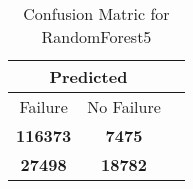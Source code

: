 \begin{table}[] 
\caption{Confusion Matric for RandomForest5} 
\label{Table: Prediction Accuracy-DMDRandomForest5OnlySunEKF-resetReflectionEKF-top2-Reflection} 
\centering 
\begin{tabular} 
 {@{}ccc@{}} 
\toprule 
\multicolumn{2}{c}{\textbf{Predicted}}
 \\ \midrule 
\multicolumn{1}{|c|}{Failure} & 
\multicolumn{1}{c|}{No Failure}
 \\ \midrule 
\multicolumn{1}{|c|}{\color{green}\textbf{116373}} & 
\multicolumn{1}{c|}{\color{red}\textbf{7475}}
 \\ \midrule 
\multicolumn{1}{|c|}{\color{red}\textbf{27498}} & 
\multicolumn{1}{c|}{\color{green}\textbf{18782}}
 \\ \bottomrule 
\end{tabular} 
\end{table} 
